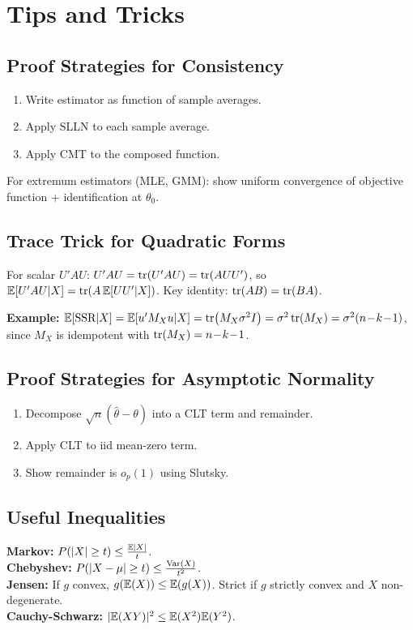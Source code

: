 \section{Tips and Tricks}

\subsection{Proof Strategies for Consistency}
\begin{enumerate}[nosep]
    \item Write estimator as function of sample averages.
    \item Apply SLLN to each sample average.
    \item Apply CMT to the composed function.
\end{enumerate}
For extremum estimators (MLE, GMM): show uniform convergence of objective function + identification at $\theta_0$.

\subsection{Trace Trick for Quadratic Forms}
For scalar $U'AU$: $U'AU = \tr(U'AU) = \tr(AUU')$, so $\mathbb{E}[U'AU|X] = \tr(A\,\mathbb{E}[UU'|X])$. Key identity: $\tr(AB)=\tr(BA)$.

\textbf{Example:} $\mathbb{E}[\text{SSR}|X]=\mathbb{E}[u'M_Xu|X]=\tr(M_X\sigma^2 I)=\sigma^2\tr(M_X)=\sigma^2(n\!-\!k\!-\!1)$, since $M_X$ is idempotent with $\tr(M_X)=n\!-\!k\!-\!1$.

\subsection{Proof Strategies for Asymptotic Normality}
\begin{enumerate}[nosep]
    \item Decompose $\sqrt{n}(\hat\theta-\theta)$ into a CLT term and remainder.
    \item Apply CLT to iid mean-zero term.
    \item Show remainder is $o_p(1)$ using Slutsky.
\end{enumerate}
\subsection{Useful Inequalities}
\textbf{Markov:} $P(|X|\geq t)\leq \frac{\mathbb{E}|X|}{t}$. \\
\textbf{Chebyshev:} $P(|X-\mu|\geq t)\leq \frac{\text{Var}(X)}{t^2}$. \\
\textbf{Jensen:} If $g$ convex, $g(\mathbb{E}(X))\leq \mathbb{E}(g(X))$. Strict if $g$ strictly convex and $X$ non-degenerate. \\
\textbf{Cauchy-Schwarz:} $|\mathbb{E}(XY)|^2\leq \mathbb{E}(X^2)\mathbb{E}(Y^2)$.

